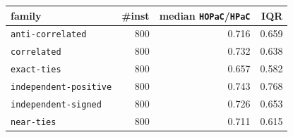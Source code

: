 \begin{tabular}{@{}lrrr@{}}
\toprule
family & \#inst & median \texttt{HOPaC}/\texttt{HPaC} & IQR \\
\midrule
\texttt{anti-correlated} & 800 & 0.716 & 0.659 \\
\texttt{correlated} & 800 & 0.732 & 0.638 \\
\texttt{exact-ties} & 800 & 0.657 & 0.582 \\
\texttt{independent-positive} & 800 & 0.743 & 0.768 \\
\texttt{independent-signed} & 800 & 0.726 & 0.653 \\
\texttt{near-ties} & 800 & 0.711 & 0.615 \\
\bottomrule
\end{tabular}
